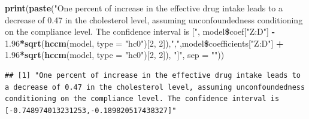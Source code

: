 \documentclass[]{article}
\newenvironment{Shaded}{\begin{snugshade}}{\end{snugshade}}
\newcommand{\KeywordTok}[1]{\textcolor[rgb]{0.13,0.29,0.53}{\textbf{#1}}}
\newcommand{\DataTypeTok}[1]{\textcolor[rgb]{0.13,0.29,0.53}{#1}}
\newcommand{\DecValTok}[1]{\textcolor[rgb]{0.00,0.00,0.81}{#1}}
\newcommand{\FloatTok}[1]{\textcolor[rgb]{0.00,0.00,0.81}{#1}}
\newcommand{\StringTok}[1]{\textcolor[rgb]{0.31,0.60,0.02}{#1}}
\newcommand{\OperatorTok}[1]{\textcolor[rgb]{0.81,0.36,0.00}{\textbf{#1}}}
\newcommand{\NormalTok}[1]{#1}
\begin{document}
\begin{Shaded}
\begin{Highlighting}[]
\KeywordTok{print}\NormalTok{(}\KeywordTok{paste}\NormalTok{(}\StringTok{"One percent of increase in the effective drug intake leads to a decrease of 0.47 in the cholesterol level, assuming unconfoundedness conditioning on the compliance level. The confidence interval is ["}\NormalTok{, model}\OperatorTok{\$}\NormalTok{coef[}\StringTok{"Z:D"}\NormalTok{] }\OperatorTok{-}\StringTok{ }\FloatTok{1.96}\OperatorTok{*}\KeywordTok{sqrt}\NormalTok{(}\KeywordTok{hccm}\NormalTok{(model, }\DataTypeTok{type =} \StringTok{"hc0"}\NormalTok{)[}\DecValTok{2}\NormalTok{, }\DecValTok{2}\NormalTok{]),}\StringTok{","}\NormalTok{,model}\OperatorTok{\$}\NormalTok{coefficients[}\StringTok{"Z:D"}\NormalTok{] }\OperatorTok{+}\StringTok{ }\FloatTok{1.96}\OperatorTok{*}\KeywordTok{sqrt}\NormalTok{(}\KeywordTok{hccm}\NormalTok{(model, }\DataTypeTok{type =} \StringTok{"hc0"}\NormalTok{)[}\DecValTok{2}\NormalTok{, }\DecValTok{2}\NormalTok{]), }\StringTok{"]"}\NormalTok{, }\DataTypeTok{sep =} \StringTok{""}\NormalTok{))}
\end{Highlighting}
\end{Shaded}

\begin{verbatim}
## [1] "One percent of increase in the effective drug intake leads to a decrease of 0.47 in the cholesterol level, assuming unconfoundedness conditioning on the compliance level. The confidence interval is [-0.748974013231253,-0.189820517438327]"
\end{verbatim}
\end{document}
